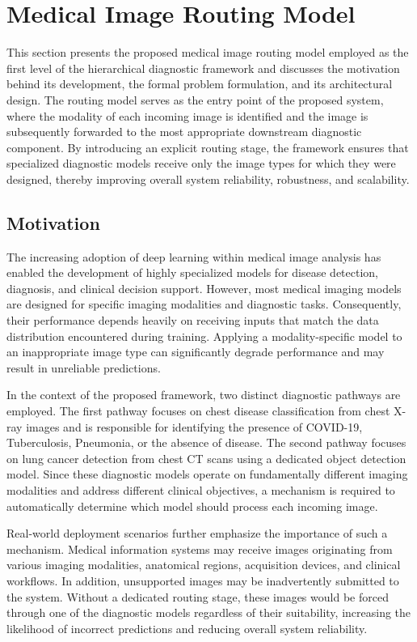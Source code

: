 \section{Medical Image Routing Model}

This section presents the proposed medical image routing model employed as the first level of the hierarchical diagnostic framework and discusses the motivation behind its development, the formal problem formulation, and its architectural design. The routing model serves as the entry point of the proposed system, where the modality of each incoming image is identified and the image is subsequently forwarded to the most appropriate downstream diagnostic component. By introducing an explicit routing stage, the framework ensures that specialized diagnostic models receive only the image types for which they were designed, thereby improving overall system reliability, robustness, and scalability.

\subsection{Motivation}

The increasing adoption of deep learning within medical image analysis has enabled the development of highly specialized models for disease detection, diagnosis, and clinical decision support. However, most medical imaging models are designed for specific imaging modalities and diagnostic tasks. Consequently, their performance depends heavily on receiving inputs that match the data distribution encountered during training. Applying a modality-specific model to an inappropriate image type can significantly degrade performance and may result in unreliable predictions.

In the context of the proposed framework, two distinct diagnostic pathways are employed. The first pathway focuses on chest disease classification from chest X-ray images and is responsible for identifying the presence of COVID-19, Tuberculosis, Pneumonia, or the absence of disease. The second pathway focuses on lung cancer detection from chest CT scans using a dedicated object detection model. Since these diagnostic models operate on fundamentally different imaging modalities and address different clinical objectives, a mechanism is required to automatically determine which model should process each incoming image.

Real-world deployment scenarios further emphasize the importance of such a mechanism. Medical information systems may receive images originating from various imaging modalities, anatomical regions, acquisition devices, and clinical workflows. In addition, unsupported images may be inadvertently submitted to the system. Without a dedicated routing stage, these images would be forced through one of the diagnostic models regardless of their suitability, increasing the likelihood of incorrect predictions and reducing overall system reliability.

